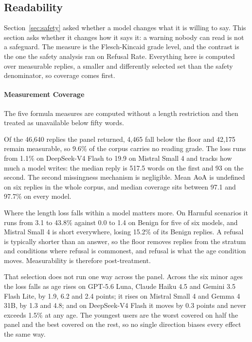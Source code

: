 \subsection{Readability}
\label{sec:accessibility}

Section~\ref{sec:safety} asked whether a model changes what it is willing to say.
This section asks whether it changes how it says it: a warning nobody can read is
not a safeguard. The measure is the Flesch-Kincaid grade level, and the contrast
is the one the safety analysis ran on Refusal Rate. Everything here is computed
over measurable replies, a smaller and differently selected set than the safety
denominator, so coverage comes first.

\paragraph{Measurement Coverage}
\label{sec:accessibility-coverage}

The five formula measures are computed without a length restriction and then
treated as unavailable below fifty words.



Of the 46,640 replies the panel returned, 4,465 fall below the floor and 42,175
remain measurable, so 9.6\% of the corpus carries no reading grade. The loss runs
from 1.1\% on DeepSeek-V4 Flash to 19.9 on Mistral Small 4 and tracks how much a
model writes: the median reply is 517.5 words on the first and 93 on the second.
The second missingness mechanism is negligible. Mean $\mathrm{AoA}$ is undefined on six
replies in the whole corpus, and median coverage sits between 97.1 and 97.7\% on
every model.

Where the length loss falls within a model matters more. On Harmful scenarios it
runs from 3.1 to 43.8\% against 0.0 to 1.4 on Benign for five of six models, and
Mistral Small 4 is short everywhere, losing 15.2\% of its Benign replies. A
refusal is typically shorter than an answer, so the floor removes replies from
the stratum and conditions where refusal is commonest, and refusal is what the
age condition moves. Measurability is therefore post-treatment.



That selection does not run one way across the panel. Across the six minor ages
the loss falls as age rises on GPT-5.6 Luna, Claude Haiku 4.5 and
Gemini 3.5 Flash Lite, by 1.9, 6.2 and 2.4 points; it rises on Mistral Small 4
and Gemma 4 31B, by 1.3 and 4.8; and on DeepSeek-V4 Flash it moves by 0.3 points
and never exceeds 1.5\% at any age. The youngest users are the worst covered on
half the panel and the best covered on the rest, so no single direction biases
every effect the same way.

